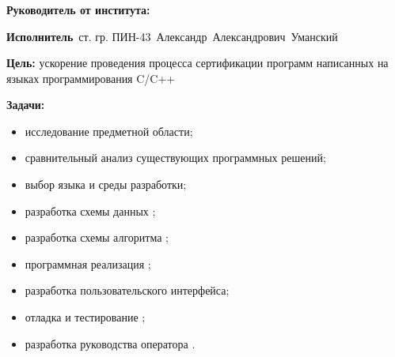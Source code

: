 \begin{frame}
    \frametitle{\textbf{\thesisTitle}}
\textbf{Руководитель от института:}~\supervisorRegaliaShort~\supervisorFioShort

\textbf{Исполнитель}~ст. гр. ПИН-43~Александр~Александрович~Уманский

\textbf{Цель:} ускорение проведения процесса сертификации программ написанных на языках программирования C/C++

\textbf{Задачи:}
\begin{itemize}
    \item исследование предметной области;
    \item сравнительный анализ существующих программных решений;
    \item выбор языка и среды разработки;
    \item разработка схемы данных {\ProgModule};
    \item разработка схемы алгоритма {\ProgModule};
    \item программная реализация {\ProgModule};
    \item разработка пользовательского интерфейса;
    \item отладка и тестирование {\ProgModule};
    \item разработка руководства оператора {\ProgModule}.
\end{itemize}
\end{frame}
